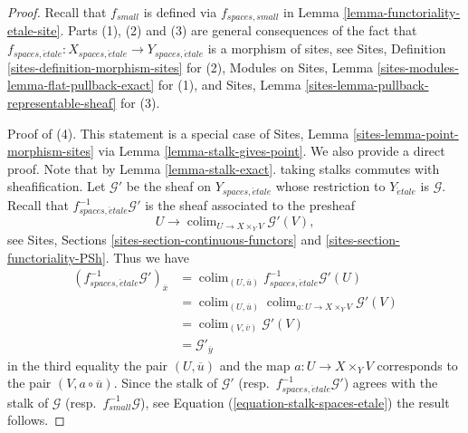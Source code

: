 \documentclass{stacks-project}
\theoremstyle{plain}
\theoremstyle{definition}
\theoremstyle{remark}
\numberwithin{equation}{subsection}
\def\colim{\mathop{\mathrm{colim}}\nolimits}
\def\etale{{\acute{e}tale}}
\begin{document}
\begin{proof}
Recall that $f_{small}$ is defined via $f_{spaces, small}$ in
Lemma \ref{lemma-functoriality-etale-site}.
Parts (1), (2) and (3) are general consequences of the fact that
$f_{spaces, \etale} :
X_{spaces, \etale}
\to
Y_{spaces, \etale}$
is a morphism of sites, see
Sites, Definition \ref{sites-definition-morphism-sites}
for (2),
Modules on Sites, Lemma \ref{sites-modules-lemma-flat-pullback-exact}
for (1), and
Sites, Lemma \ref{sites-lemma-pullback-representable-sheaf}
for (3).

\medskip\noindent
Proof of (4). This statement is a special case of
Sites, Lemma \ref{sites-lemma-point-morphism-sites}
via
Lemma \ref{lemma-stalk-gives-point}.
We also provide a direct proof. Note that by
Lemma \ref{lemma-stalk-exact}.
taking stalks commutes with sheafification.
Let $\mathcal{G}'$ be the sheaf on $Y_{spaces, \etale}$ whose restriction
to $Y_\etale$ is $\mathcal{G}$.
Recall that $f_{spaces, \etale}^{-1}\mathcal{G}'$ is the sheaf
associated to the presheaf
$$
U \longrightarrow \colim_{U \to X \times_Y V} \mathcal{G}'(V),
$$
see
Sites, Sections \ref{sites-section-continuous-functors} and
\ref{sites-section-functoriality-PSh}.
Thus we have
\begin{align*}
(f_{spaces, \etale}^{-1}\mathcal{G}')_{\overline{x}}
& =
\colim_{(U, \overline{u})} f_{spaces, \etale}^{-1}\mathcal{G}'(U)
\\
& = \colim_{(U, \overline{u})}
\colim_{a : U \to X \times_Y V} \mathcal{G}'(V) \\
& = \colim_{(V, \overline{v})} \mathcal{G}'(V) \\
& = \mathcal{G}'_{\overline{y}}
\end{align*}
in the third equality the pair $(U, \overline{u})$ and the map
$a : U \to X \times_Y V$ corresponds to the pair $(V, a \circ \overline{u})$.
Since the stalk of $\mathcal{G}'$
(resp.\ $f_{spaces, \etale}^{-1}\mathcal{G}'$)
agrees with the stalk of $\mathcal{G}$ (resp.\ $f_{small}^{-1}\mathcal{G}$),
see
Equation (\ref{equation-stalk-spaces-etale})
the result follows.
\end{proof}
\end{document}

